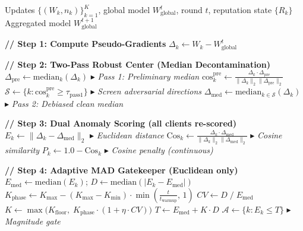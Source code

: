 \documentclass[10pt, conference]{IEEEtran}
\begin{document}
\begin{algorithm}[htbp]
\caption{AEGIS: Two-Pass Byzantine-Resilient Aggregation with Soft Directional Penalty}
\label{alg:aegis}
\begin{algorithmic}[1]

\REQUIRE Updates $\{(W_k, n_k)\}_{k=1}^{K}$, global model $W^t_{\text{global}}$, round $t$, reputation state $\{R_k\}$
\ENSURE Aggregated model $W^{t+1}_{\text{global}}$

\STATE \textbf{// Step 1: Compute Pseudo-Gradients}
    \STATE $\Delta_k \leftarrow W_k - W^t_{\text{global}}$
\ENDFOR

\STATE

\STATE \textbf{// Step 2: Two-Pass Robust Center (Median Decontamination)}
\STATE $\Delta_{\text{pre}} \leftarrow \text{median}_k(\Delta_k)$ \hfill $\blacktriangleright$ \textit{Pass 1: Preliminary median}
    \STATE $\text{cos}^{\text{pre}}_k \leftarrow \frac{\Delta_k \cdot \Delta_{\text{pre}}}{\|\Delta_k\|_2 \|\Delta_{\text{pre}}\|_2}$
\ENDFOR
\STATE $\mathcal{S} \leftarrow \{k : \text{cos}^{\text{pre}}_k \geq \tau_{\text{pass1}}\}$ \hfill $\blacktriangleright$ \textit{Screen adversarial directions}
\STATE $\Delta_{\text{med}} \leftarrow \text{median}_{k \in \mathcal{S}}(\Delta_k)$ \hfill $\blacktriangleright$ \textit{Pass 2: Debiased clean median}

\STATE

\STATE \textbf{// Step 3: Dual Anomaly Scoring (all clients re-scored)}
    \STATE $E_k \leftarrow \|\Delta_k - \Delta_{\text{med}}\|_2$ \hfill $\blacktriangleright$ \textit{Euclidean distance}
    \STATE $\text{Cos}_k \leftarrow \frac{\Delta_k \cdot \Delta_{\text{med}}}{\|\Delta_k\|_2 \|\Delta_{\text{med}}\|_2}$ \hfill $\blacktriangleright$ \textit{Cosine similarity}
    \STATE $P_k \leftarrow 1.0 - \text{Cos}_k$ \hfill $\blacktriangleright$ \textit{Cosine penalty (continuous)}
\ENDFOR

\STATE

\STATE \textbf{// Step 4: Adaptive MAD Gatekeeper (Euclidean only)}
\STATE $E_{\text{med}} \leftarrow \text{median}(E_k)$; \quad $D \leftarrow \text{median}(|E_k - E_{\text{med}}|)$
\STATE $K_{\text{phase}} \leftarrow K_{\max} - (K_{\max} - K_{\min}) \cdot \min\!\left(\frac{t}{t_{\text{warmup}}},\, 1\right)$
\STATE $CV \leftarrow D \;/\; E_{\text{med}}$
\STATE $K \leftarrow \max\!\big(K_{\text{floor}},\; K_{\text{phase}} \cdot (1 + \eta \cdot CV)\big)$
\STATE $T \leftarrow E_{\text{med}} + K \cdot D$
\STATE $\mathcal{A} \leftarrow \{k : E_k \leq T\}$ \hfill $\blacktriangleright$ \textit{Magnitude gate}


\end{algorithmic}
\end{algorithm}
\end{document}
